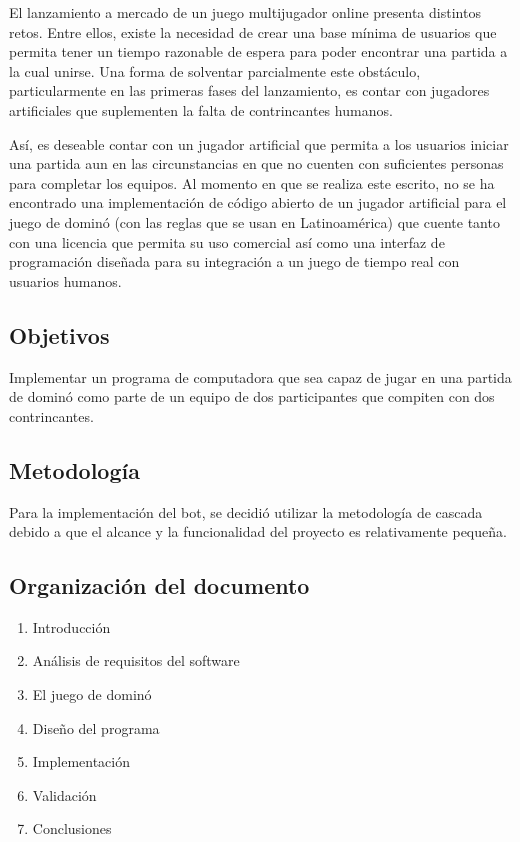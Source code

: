 El lanzamiento a mercado de un juego multijugador online presenta distintos
retos. Entre ellos, existe la necesidad de crear una base mínima de usuarios que
permita tener un tiempo razonable de espera para poder encontrar una partida a
la cual unirse. Una forma de solventar parcialmente este obstáculo,
particularmente en las primeras fases del lanzamiento, es contar con jugadores
artificiales que suplementen la falta de contrincantes humanos.

Así, es deseable contar con un jugador artificial que permita a los usuarios
iniciar una partida aun en las circunstancias en que no cuenten con suficientes
personas para completar los equipos. Al momento en que se realiza este escrito,
no se ha encontrado una implementación de código abierto de un jugador
artificial para el juego de dominó (con las reglas que se usan en Latinoamérica)
que cuente tanto con una licencia que permita su uso comercial así como una
interfaz de programación diseñada para su integración a un juego de tiempo real
con usuarios humanos.



\subsection{Objetivos}

Implementar un programa de computadora que sea capaz de jugar en una partida de
dominó como parte de un equipo de dos participantes que compiten con dos
contrincantes.

\subsection{Metodología}

Para la implementación del bot, se decidió utilizar la metodología de cascada
debido a que el alcance y la funcionalidad del proyecto es relativamente
pequeña.

\subsection{Organización del documento}
\begin{enumerate}
    \item Introducción
    \item Análisis de requisitos del software
    \item El juego de dominó
    \item Diseño del programa
    \item Implementación
    \item Validación
    \item Conclusiones
\end{enumerate}


